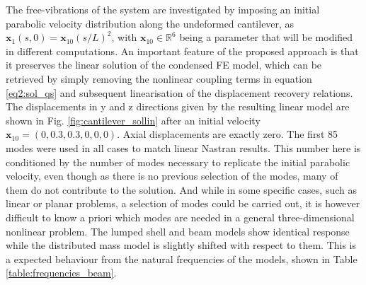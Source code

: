 \documentclass[11pt]{article}
\begin{document}
The free-vibrations of the system are investigated by imposing an initial parabolic velocity distribution along the undeformed cantilever, as $\pmb{x}_1(s,0) = \pmb{x}_{10}(s/L)^2 $, with $\pmb{x}_{10} \in \mathbb{R}^6$ being a parameter that will be modified in different computations. An important feature of the proposed approach is that it preserves the linear solution of the condensed FE model, which can be retrieved by simply removing the nonlinear coupling terms in equation \ref{eq2:sol_qs} and subsequent linearisation of the displacement recovery relations. The displacements in y and z directions given by the resulting linear model are shown in Fig. \ref{fig:cantilever_sollin} after an initial velocity $\pmb{x}_{10} = (0,0.3,0.3,0,0,0)$. Axial displacements are exactly zero. The first 85 modes were used in all cases to match linear Nastran results. This number here is conditioned by the number of modes necessary to replicate the initial parabolic velocity, even though as there is no previous selection of the modes, many of them do not contribute to the solution. And while in some specific cases, such as linear or planar problems, a selection of modes could be carried out, it is however difficult to know a priori which modes are needed in a general three-dimensional nonlinear problem. The lumped shell and beam models show identical response while the distributed mass model is slightly shifted with respect to them. This is a expected behaviour from the natural frequencies of the models, shown in Table \ref{table:frequencies_beam}.
\end{document}
